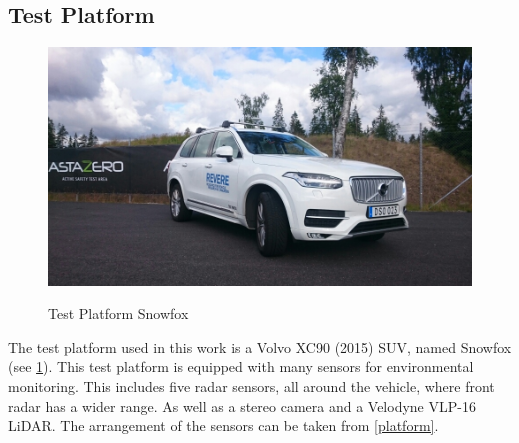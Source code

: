 \subsection{Test Platform}

\begin{figure}[!ht]
\caption{Test Platform Snowfox}
\includegraphics[width=\columnwidth]{bilder/snowfox.jpg}
\label{snowfox}
\end{figure}


The test platform used in this work is a Volvo XC90 (2015) SUV, named Snowfox (see \cref{snowfox}). 
This test platform is equipped with many sensors for environmental monitoring. This includes five radar sensors, all around the vehicle, where front radar has a wider range.
As well as a stereo camera and a Velodyne VLP-16 LiDAR. The arrangement of the sensors can be taken from \cref{platform}.


